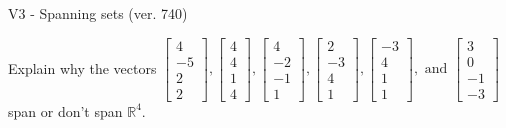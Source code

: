 \begin{exercise}
  \begin{exerciseTitle}V3 - Spanning sets (ver. 740)\end{exerciseTitle}
  \begin{exerciseStatement}
    Explain why the vectors \(\left[\begin{array}{r}
4 \\
-5 \\
2 \\
2
\end{array}\right] , \left[\begin{array}{r}
4 \\
4 \\
1 \\
4
\end{array}\right] , \left[\begin{array}{r}
4 \\
-2 \\
-1 \\
1
\end{array}\right] , \left[\begin{array}{r}
2 \\
-3 \\
4 \\
1
\end{array}\right] , \left[\begin{array}{r}
-3 \\
4 \\
1 \\
1
\end{array}\right] , \text{ and } \left[\begin{array}{r}
3 \\
0 \\
-1 \\
-3
\end{array}\right]\) span or don't span \(\mathbb{R}^4\). 
	



\end{exerciseStatement}
\end{exercise}
